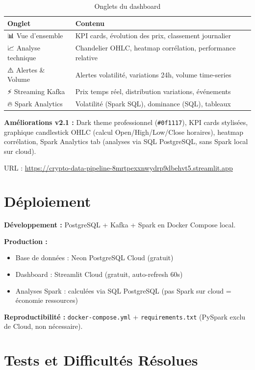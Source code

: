 \documentclass[11pt,a4paper]{article}
\begin{document}
\begin{table}[H]
\centering
\small
\begin{tabular}{|l|p{6cm}|}
\hline
\textbf{Onglet} & \textbf{Contenu} \\
\hline
📊 Vue d'ensemble & KPI cards, évolution des prix, classement journalier \\
\hline
📈 Analyse technique & Chandelier OHLC, heatmap corrélation, performance relative \\
\hline
⚠️ Alertes \& Volume & Alertes volatilité, variations 24h, volume time-series \\
\hline
⚡ Streaming Kafka & Prix temps réel, distribution variations, événements \\
\hline
🔥 Spark Analytics & Volatilité (Spark SQL), dominance (SQL), tableaux \\
\hline
\end{tabular}
\caption{Onglets du dashboard}
\end{table}

\textbf{Améliorations v2.1 :} Dark theme professionnel (\texttt{\#0f1117}), KPI cards stylisées, graphique candlestick OHLC (calcul Open/High/Low/Close horaires), heatmap corrélation, Spark Analytics tab (analyses via SQL PostgreSQL, sans Spark local sur cloud).

URL : \url{https://crypto-data-pipeline-8mrtpexxnwydrp9dbehvt5.streamlit.app}

\section{Déploiement}

\textbf{Développement :} PostgreSQL + Kafka + Spark en Docker Compose local.

\textbf{Production :}
\begin{itemize}[noitemsep]
    \item Base de données : Neon PostgreSQL Cloud (gratuit)
    \item Dashboard : Streamlit Cloud (gratuit, auto-refresh 60s)
    \item Analyses Spark : calculées via SQL PostgreSQL (pas Spark sur cloud = économie ressources)
\end{itemize}

\textbf{Reproductibilité :} \texttt{docker-compose.yml} + \texttt{requirements.txt} (PySpark exclu de Cloud, non nécessaire).

\section{Tests et Difficultés Résolues}
\end{document}
